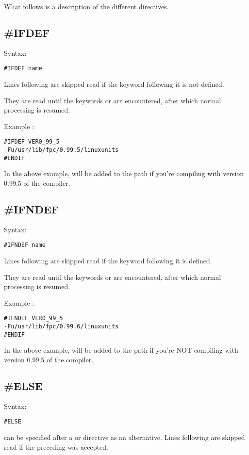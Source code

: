 \documentclass{report}
\begin{document}
What follows is a description of the different directives.

\subsection{\#IFDEF}
Syntax:
\begin{verbatim}
#IFDEF name
\end{verbatim}
Lines following  are skipped read if the keyword 
following it is not defined.

They are read until the keywords  or  are
encountered, after which normal processing is resumed.

Example :
\begin{verbatim}
#IFDEF VER0_99_5
-Fu/usr/lib/fpc/0.99.5/linuxunits
#ENDIF
\end{verbatim}
In the above example,  will be added to
the path if you're compiling with version 0.99.5 of the compiler.

\subsection{\#IFNDEF}
Syntax:
\begin{verbatim}
#IFNDEF name
\end{verbatim}
Lines following  are skipped read if the keyword 
following it is defined.

They are read until the keywords  or  are
encountered, after which normal processing is resumed.

Example :
\begin{verbatim}
#IFNDEF VER0_99_5
-Fu/usr/lib/fpc/0.99.6/linuxunits
#ENDIF
\end{verbatim}
In the above example,  will be added to
the path if you're NOT compiling with version 0.99.5 of the compiler.

\subsection{\#ELSE}
Syntax:
\begin{verbatim}
#ELSE
\end{verbatim}
 can be specified after a  or 
directive as an alternative.
Lines following  are skipped read if the preceding 
 was accepted.
\end{document}
